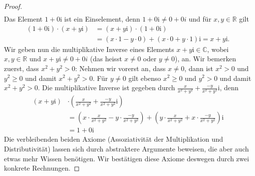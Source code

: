 \documentclass[../Analysis1_script.tex]{subfiles}
\begin{document}
\begin{proof}
\begin{equation}
\begin{aligned}
	\end{aligned}
	\end{equation}  
	Das Element $1+0\mathrm {i}$ ist ein Einselement, denn $1+0\mathrm {i} \neq 0+0i$ und für $x,y\in \mathbb {R}$ gilt 
	\begin{equation}
	\begin{aligned}
		(1+0\mathrm {i})\cdot (x+y\mathrm {i}) &= (x+y\mathrm {i})\cdot (1+0\mathrm {i}) \\ &= (x\cdot 1- y \cdot 0) + (x \cdot 0+ y \cdot 1) \mathrm {i} = x+y\mathrm {i}.
	\end{aligned}
	\end{equation}
	Wir geben nun die multiplikative Inverse eines Elements $x+y\mathrm {i} \in \mathbb {C}$, wobei $x,y\in \mathbb {R}$ und $x+y\mathrm {i} \neq 0+0i$ (das heisst $x\neq 0$ oder $y \neq 0$), an. Wir bemerken zuerst, dass $x^2+y^2 > 0$: Nehmen wir vorerst an, dass $x\neq 0$, dann ist $x^2 > 0$ und $y^2 \geq 0$ und damit $x^2+y^2 > 0$. Für $y \neq 0$ gilt ebenso $x^2\geq 0$ und $y^2 > 0$ und damit $x^2+y^2 > 0$. Die multiplikative Inverse ist gegeben durch $\frac {x}{x^{2}+y^{2}} + \frac {-y}{x^2+y^2}\mathrm {i}$, denn 
	\begin{equation}
	\begin{aligned}
		(x+y\mathrm {i})&\cdot \left (\frac {x}{x^{2}+y^{2}} + \frac {-y}{x^2+y^2}\mathrm {i}\right )\\ &= \left (x \cdot \frac {x}{x^{2}+y^{2}} - y \cdot \frac {-y}{x^2+y^2}\right ) + \left (y\cdot \frac {x}{x^{2}+y^{2}} + x\cdot \frac {-y}{x^2+y^2} \right )\mathrm {i}\\ &= 1 + 0\mathrm {i}
	\end{aligned}
	\end{equation}  
	Die verbleibenden beiden Axiome (Assoziativität der Multiplikation und Distributivität) lassen sich durch abstraktere Argumente beweisen, die aber auch etwas mehr Wissen benötigen. Wir bestätigen diese Axiome deswegen durch zwei konkrete Rechnungen.
	

\end{proof}
\end{document}
